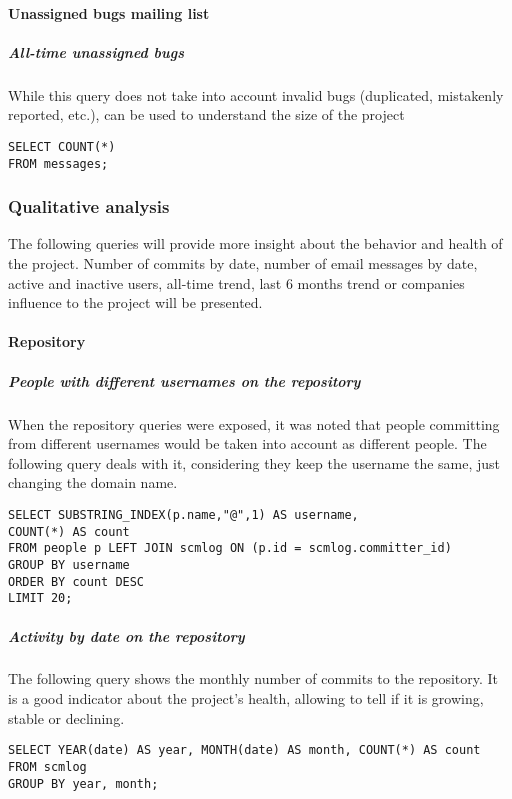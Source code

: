 \paragraph{Unassigned bugs mailing list}

\subparagraph{All-time unassigned bugs}

While this query does not take into account invalid bugs (duplicated, mistakenly reported, etc.), can be used to understand the size of the project

\begin{verbatim}
SELECT COUNT(*) 
FROM messages;
\end{verbatim}

\subsubsection{Qualitative analysis}

The following queries will provide more insight about the behavior and health of the project. Number of commits by date, number of email messages by date, active and inactive users, all-time trend, last 6 months trend or companies influence to the project will be presented.

\paragraph{Repository}

\subparagraph{People with different usernames on the repository}

When the repository queries were exposed, it was noted that people committing from different usernames would be taken into account as different people. The following query deals with it, considering they keep the username the same, just changing the domain name.

\begin{verbatim}
SELECT SUBSTRING_INDEX(p.name,"@",1) AS username, 
COUNT(*) AS count 
FROM people p LEFT JOIN scmlog ON (p.id = scmlog.committer_id)
GROUP BY username 
ORDER BY count DESC
LIMIT 20;
\end{verbatim}

\subparagraph{Activity by date on the repository}

The following query shows the monthly number of commits to the repository. It is a good indicator about the project's health, allowing to tell if it is growing, stable or declining.

\begin{verbatim}
SELECT YEAR(date) AS year, MONTH(date) AS month, COUNT(*) AS count 
FROM scmlog
GROUP BY year, month;
\end{verbatim}

